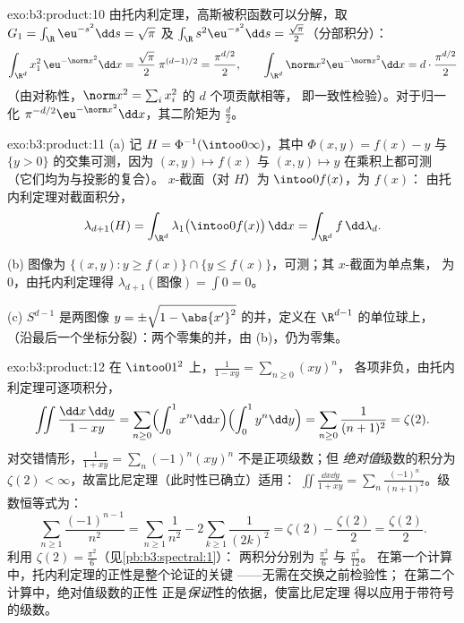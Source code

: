 \begin{solution}{exo:b3:product:10}
由托内利定理，高斯被积函数可以分解，取 $G_1 =
\int_\R\eu^{-s^2}\dd s = \sqrt\pi$ 及 $\int_\R
s^2\eu^{-s^2}\dd s = \frac{\sqrt\pi}2$（分部积分）：
\[
\int_{\R^d}x_1^2\,\eu^{-\norm x^2}\dd x =
\frac{\sqrt\pi}2\;\pi^{(d-1)/2} = \frac{\pi^{d/2}}2,
\qquad
\int_{\R^d}\norm x^2\eu^{-\norm x^2}\dd x =
d\cdot\frac{\pi^{d/2}}2
\]
（由对称性，$\norm x^2 = \sum_ix_i^2$ 的 $d$ 个项贡献相等，
即一致性检验）。对于归一化
$\pi^{-d/2}\eu^{-\norm x^2}\dd x$，其二阶矩为
$\frac d2$。
\end{solution}

\begin{solution}{exo:b3:product:11}
(a) 记 $H = \Phi^{-1}(\intoo0\infty)$，其中 $\Phi(x, y) = f(x) -
y$ 与 $\{y > 0\}$ 的交集可测，因为 $(x, y)
\mapsto f(x)$ 与 $(x,y)\mapsto y$ 在乘积上都可测
（它们均为与投影的复合）。
$x$-截面（对 $H$）为 $\intoo0{f(x)}$，为 $f(x)$：
由托内利定理对截面积分，
\[
\lambda_{d+1}(H) = \int_{\R^d}\lambda_1\bigl(\intoo0{f(x)}
\bigr)\,\dd x = \int_{\R^d}f\,\dd\lambda_d .
\]

(b) 图像为 $\{(x,y) : y \geq f(x)\} \cap \{y \leq
f(x)\}$，可测；其 $x$-截面为单点集，
为 $0$，由托内利定理得 $\lambda_{d+1}(\text{图像}) =
\int 0 = 0$。

(c) $S^{d-1}$ 是两图像 $y =
\pm\sqrt{1 - \abs{x'}^2}$ 的并，定义在 $\R^{d-1}$ 的单位球上，
（沿最后一个坐标分裂）：两个零集的并，由
(b)，仍为零集。
\end{solution}

\begin{solution}{exo:b3:product:12}
在 $\intoo01^2$ 上，$\frac1{1 - xy} = \sum_{n\geq0}(xy)^n$，
各项非负，由托内利定理可逐项积分，
\[
\iint\frac{\dd x\,\dd y}{1 - xy}
= \sum_{n\geq0}\Bigl(\int_0^1x^n\dd x\Bigr)
\Bigl(\int_0^1y^n\dd y\Bigr)
= \sum_{n\geq0}\frac1{(n+1)^2} = \zeta(2) .
\]
对交错情形，$\frac1{1 + xy} =
\sum_n(-1)^n(xy)^n$ 不是正项级数；但
\emph{绝对值}级数的积分为 $\zeta(2) <
\infty$，故富比尼定理（此时性已确立）适用：
$\iint\frac{\dd x\dd y}{1 + xy} =
\sum_n\frac{(-1)^n}{(n+1)^2}$。级数恒等式为：
\[
\sum_{n\geq1}\frac{(-1)^{n-1}}{n^2}
= \sum_{n\geq1}\frac1{n^2} - 2\sum_{k\geq1}\frac1{(2k)^2}
= \zeta(2) - \frac{\zeta(2)}2 = \frac{\zeta(2)}2 .
\]
利用 $\zeta(2) = \frac{\pi^2}6$（见\cref{pb:b3:spectral:1}）：
两积分分别为 $\frac{\pi^2}6$ 与 $\frac{\pi^2}{12}$。
在第一个计算中，托内利定理的正性是整个论证的关键
——无需在交换之前检验性；
在第二个计算中，绝对值级数的正性
正是\emph{保证}性的依据，使富比尼定理
得以应用于带符号的级数。
\end{solution}

